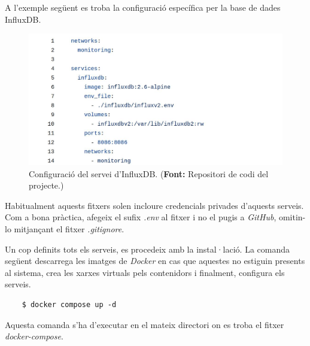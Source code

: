 \clearpage

\noindent
A l'exemple següent es troba la configuració específica per la base de dades InfluxDB.

\begin{figure}[htbp]
    \centerline{\includegraphics[width=\textwidth]{figures/docker-compose-influxdb}}
    \captionsetup{justification=centering}
    \caption[Configuració del servei d'InfluxDB.]{Configuració del servei d'InfluxDB. (\textbf{Font:} Repositori de codi del projecte.)}\label{fig:docker-compose-influxdb}
\end{figure}

\begin{tcolorbox}[colback=blue!5!white, colframe=blue!75!black, title=Fitxers de configuració]
    Habitualment aquests fitxers solen incloure credencials privades d'aquests serveis.
    Com a bona pràctica, afegeix el sufix \textit{.env} al fitxer i no el pugis a \textit{\gls{GitHub}}, omitin-lo mitjançant el fitxer \textit{.\gls{gitignore}}.
\end{tcolorbox}
\vspace{1em}

\noindent
Un cop definits tots els serveis, es procedeix amb la instal·lació.
La comanda següent descarrega les imatges de \textit{\gls{Docker}} en cas que aquestes no estiguin presents al sistema,
crea les xarxes virtuals pels contenidors i finalment, configura els serveis.

\begin{verbatim}
    $ docker compose up -d
\end{verbatim}

\begin{tcolorbox}[colback=red!5!white, colframe=red!75!black, title=Atenció]
    Aquesta comanda s'ha d'executar en el mateix directori on es troba el fitxer \textit{\gls{docker-compose}}.
\end{tcolorbox}


